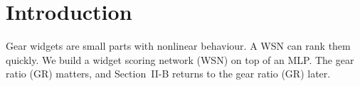 \section{Introduction}\label{sec:intro}

Gear widgets are small parts with nonlinear behaviour.
A WSN can rank them quickly.
We build a widget scoring network (WSN) on top of an MLP.
The gear ratio (GR) matters, and Section~II-B returns to the gear ratio (GR) later.
